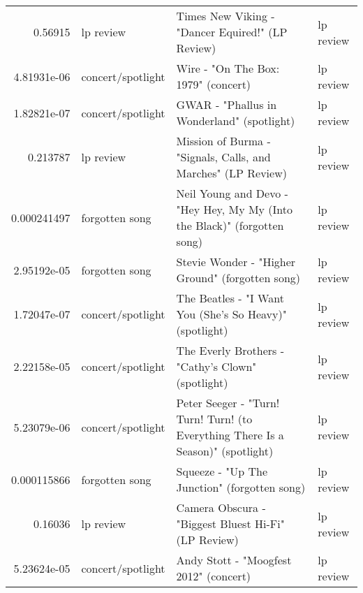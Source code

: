 \documentclass[letterpaper,10pt]{article}
\begin{document}
\begin{table}[H]
\begin{adjustbox}{max width=\linewidth}
\begin{tabular}{rlll}
  0.56915     & lp review                 & Times New Viking - "Dancer Equired!" (LP Review)                                                             & lp review                 \\
  4.81931e-06 & concert/spotlight         & Wire - "On The Box: 1979" (concert)                                                                          & lp review                 \\
  1.82821e-07 & concert/spotlight         & GWAR - "Phallus in Wonderland" (spotlight)                                                                   & lp review                 \\
  0.213787    & lp review                 & Mission of Burma - "Signals, Calls, and Marches" (LP Review)                                                 & lp review                 \\
  0.000241497 & forgotten song            & Neil Young and Devo - "Hey Hey, My My (Into the Black)" (forgotten song)                                     & lp review                 \\
  2.95192e-05 & forgotten song            & Stevie Wonder - "Higher Ground" (forgotten song)                                                             & lp review                 \\
  1.72047e-07 & concert/spotlight         & The Beatles - "I Want You (She's So Heavy)" (spotlight)                                                      & lp review                 \\
  2.22158e-05 & concert/spotlight         & The Everly Brothers - "Cathy's Clown" (spotlight)                                                            & lp review                 \\
  5.23079e-06 & concert/spotlight         & Peter Seeger - "Turn! Turn! Turn! (to Everything There Is a Season)" (spotlight)                             & lp review                 \\
  0.000115866 & forgotten song            & Squeeze - "Up The Junction" (forgotten song)                                                                 & lp review                 \\
  0.16036     & lp review                 & Camera Obscura - "Biggest Bluest Hi-Fi" (LP Review)                                                          & lp review                 \\
  5.23624e-05 & concert/spotlight         & Andy Stott - "Moogfest 2012" (concert)                                                                       & lp review                 \\

\end{tabular}
\end{adjustbox}
\end{table}
\end{document}

